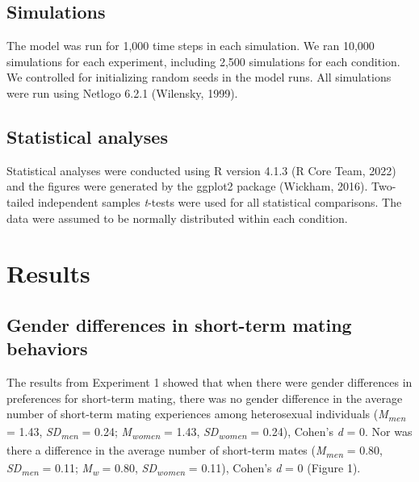 \documentclass[
  11pt,
]{article}
\begin{document}
\hypertarget{simulations}{%
\subsection{Simulations}\label{simulations}}

The model was run for 1,000 time steps in each simulation. We ran 10,000
simulations for each experiment, including 2,500 simulations for each
condition. We controlled for initializing random seeds in the model
runs. All simulations were run using Netlogo 6.2.1 (Wilensky, 1999).

\hypertarget{statistical-analyses}{%
\subsection{Statistical analyses}\label{statistical-analyses}}

Statistical analyses were conducted using R version 4.1.3 (R Core Team,
2022) and the figures were generated by the ggplot2 package (Wickham,
2016). Two-tailed independent samples \emph{t}-tests were used for all
statistical comparisons. The data were assumed to be normally
distributed within each condition.

\hypertarget{results}{%
\section{Results}\label{results}}

\hypertarget{gender-differences-in-short-term-mating-behaviors}{%
\subsection{Gender differences in short-term mating
behaviors}\label{gender-differences-in-short-term-mating-behaviors}}

The results from Experiment 1 showed that when there were gender
differences in preferences for short-term mating, there was no gender
difference in the average number of short-term mating experiences among
heterosexual individuals (\emph{M\textsubscript{men}} = 1.43,
\emph{SD\textsubscript{men}} = 0.24; \emph{M\textsubscript{women}} =
1.43, \emph{SD\textsubscript{women}} = 0.24), Cohen's \emph{d} = 0. Nor
was there a difference in the average number of short-term mates
(\emph{M\textsubscript{men}} = 0.80, \emph{SD\textsubscript{men}} =
0.11; \emph{M\textsubscript{w}} = 0.80, \emph{SD\textsubscript{women}} =
0.11), Cohen's \emph{d} = 0 (Figure 1).
\end{document}
